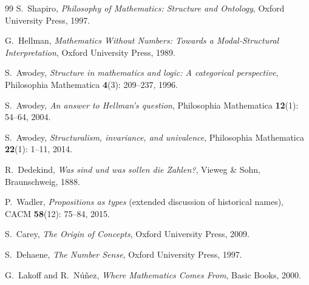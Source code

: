 \documentclass[12pt]{article}
\theoremstyle{definition}
\theoremstyle{remark}
\begin{document}
\begin{thebibliography}{99}
S.~Shapiro,
\emph{Philosophy of Mathematics: Structure and Ontology},
Oxford University Press, 1997.

G.~Hellman,
\emph{Mathematics Without Numbers: Towards a Modal-Structural Interpretation},
Oxford University Press, 1989.

S.~Awodey,
\emph{Structure in mathematics and logic: A categorical perspective},
Philosophia Mathematica \textbf{4}(3): 209--237, 1996.

S.~Awodey,
\emph{An answer to Hellman's question},
Philosophia Mathematica \textbf{12}(1): 54--64, 2004.

S.~Awodey,
\emph{Structuralism, invariance, and univalence},
Philosophia Mathematica \textbf{22}(1): 1--11, 2014.

R.~Dedekind,
\emph{Was sind und was sollen die Zahlen?},
Vieweg \& Sohn, Braunschweig, 1888.


P.~Wadler,
\emph{Propositions as types}
(extended discussion of historical names),
CACM \textbf{58}(12): 75--84, 2015.

S.~Carey,
\emph{The Origin of Concepts},
Oxford University Press, 2009.

S.~Dehaene,
\emph{The Number Sense},
Oxford University Press, 1997.

G.~Lakoff and R.~N\'u\~nez,
\emph{Where Mathematics Comes From},
Basic Books, 2000.

\end{thebibliography}
\end{document}
